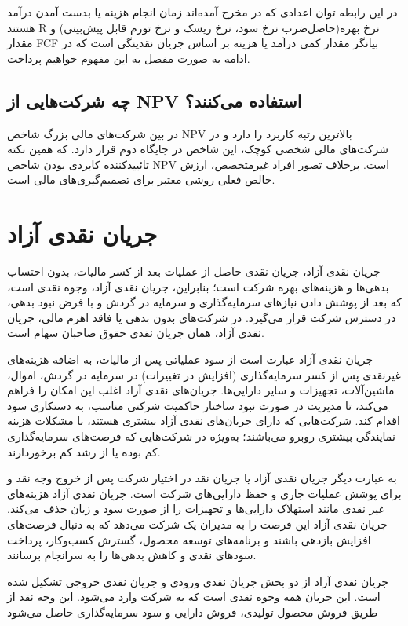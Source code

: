 \documentclass{CCI2020}
\begin{document}
در این رابطه 
توان اعدادی که در مخرج آمده‌اند
زمان انجام هزینه یا بدست آمدن درآمد هستند 
R
نرخ بهره(حاصل‌ضرب نرخ سود، نرخ ریسک و نرخ تورم قابل پیش‌بینی) 
و مقدار 
FCF
بیانگر مقدار کمی درآمد یا هزینه بر اساس جریان نقدینگی است که در ادامه به صورت مفصل به این مفهوم خواهیم پرداخت.
 
\subsection{چه شرکت‌هایی از NPV استفاده می‌کنند؟}
در بین شرکت‌های مالی بزرگ شاخص 
NPV
بالاترین رتبه کاربرد را دارد و در شرکت‌های مالی شخصی کوچک، این شاخص  در جایگاه دوم قرار دارد. که همین نکته تائیید‌کننده کابردی بودن شاخص 
NPV
است.
برخلاف تصور افراد غیر‌متخصص، ارزش خالص فعلی روشی معتبر برای تصمیم‌گیری‌های مالی است.

\section{جریان نقدی آزاد}
جریان نقدی آزاد، جریان نقدی حاصل از عملیات بعد از کسر مالیات، بدون احتساب بدهی‌ها و هزینه‌های بهره شرکت است؛ بنابراین، جریان نقدی آزاد، وجوه نقدی است، که بعد از پوشش دادن نیازهای سرمایه‌گذاری و سرمایه در گردش و با فرض نبود بدهی، در دسترس شرکت قرار می‌گیرد. در شرکت‌های بدون بدهی یا فاقد اهرم مالی، جریان نقدی آزاد، همان جریان نقدی حقوق صاحبان سهام است.

جریان نقدی آزاد عبارت است از سود عملیاتی پس از مالیات، به اضافه هزینه‌های غیرنقدی پس از کسر سرمایه‌گذاری (افزایش در تغییرات) در سرمایه در گردش، اموال، ماشین‌آلات، تجهیزات و سایر دارایی‌ها. جریان‌های نقدی آزاد اغلب این امکان را فراهم می‌کند، تا مدیریت در صورت نبود ساختار حاکمیت شرکتی مناسب، به دستکاری سود اقدام کند. شرکت‌هایی که دارای جریان‌های نقدی آزاد بیشتری هستند، با مشکلات هزینه نمایندگی بیشتری روبرو می‌باشند؛ به‌ویژه در شرکت‌هایی که فرصت‌های سرمایه‌گذاری کم بوده یا از رشد کم برخوردارند.

به عبارت دیگر 
جریان نقدی آزاد یا  جریان نقد در اختیار شرکت پس از خروج وجه نقد و برای پوشش عملیات جاری و حفظ دارایی‌های شرکت است. جریان نقدی آزاد هزینه‌های غیر نقدی مانند استهلاک دارایی‌ها و تجهیزات را از صورت سود و زیان حذف می‌کند. جریان نقدی آزاد این فرصت را به مدیران یک شرکت می‌دهد که به دنبال فرصت‌های افزایش بازدهی باشند و برنامه‌های توسعه محصول، گسترش کسب‌وکار، پرداخت سودهای نقدی و کاهش بدهی‌ها را به سرانجام برسانند.\cite{corporatefinanceinstitute.com}


جریان نقدی آزاد از دو بخش جریان نقدی ورودی و جریان نقدی خروجی تشکیل شده است.
این جریان همه وجوه نقدی است که به شرکت وارد می‌شود. این وجه نقد از طریق فروش محصول تولیدی، فروش دارایی و سود سرمایه‌گذاری حاصل می‌شود
\end{document}
